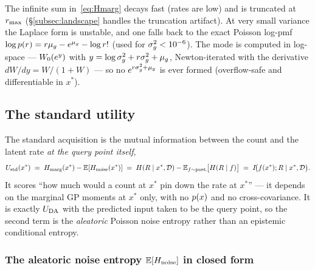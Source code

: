The infinite sum in~\eqref{eq:Hmarg} decays fast (rates are low) and is truncated at
$r_{\max}$ (\S\ref{subsec:landscape} handles the truncation artifact). At very small
variance the Laplace form is unstable, and one falls back to the exact Poisson
log-pmf $\log p(r)=r\mu_{g}-e^{\mu_{g}}-\log r!$ (used for $\sigma_{g}^{2}<10^{-6}$). The mode is
computed in log-space --- $W_{0}(e^{y})$ with $y=\log\sigma_{g}^{2}+r\sigma_{g}^{2}+\mu_{g}$,
Newton-iterated with the derivative $dW/dy=W/(1+W)$ --- so no $e^{r\sigma_{g}^{2}+\mu_{g}}$ is
ever formed (overflow-safe and differentiable in $x^{*}$).

\subsection{The standard utility}
\label{subsec:standard}

The standard acquisition is the mutual information between the count and the latent
rate \emph{at the query point itself},
%
\begin{equation}
  U_{\mathrm{std}}(x^{*})
  \;=\; H_{\mathrm{marg}}(x^{*}) - \mathbb{E}[H_{\mathrm{noise}}(x^{*})]
  \;=\; H(R\mid x^{*},\mathcal D) - \mathbb{E}_{f\sim\text{post.}}\!\big[H(R\mid f)\big]
  \;=\; I\!\big(f(x^{*});R\mid x^{*},\mathcal D\big).
  \label{eq:Ustd}
\end{equation}
%
It scores ``how much would a count at $x^{*}$ pin down the rate at $x^{*}$'' --- it
depends on the marginal GP moments at $x^{*}$ only, with no $p(x)$ and no
cross-covariance. It is exactly $U_{\mathrm{DA}}$ with the predicted input taken to be the
query point, so the second term is the \emph{aleatoric} Poisson noise entropy rather
than an epistemic conditional entropy.

\subsubsection{The aleatoric noise entropy \texorpdfstring{$\mathbb{E}[H_{\mathrm{noise}}]$}{E[H\_noise]} in closed form}
\label{subsubsec:hnoise}

